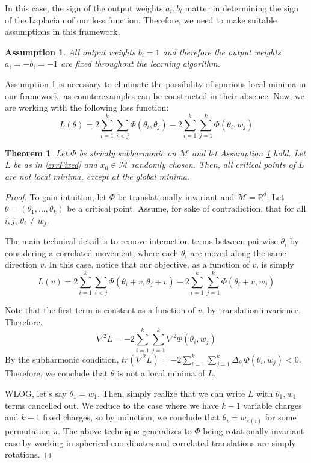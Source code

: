 \documentclass{article}
\newtheorem{theorem}{Theorem}[section]
\newtheorem{assumption}{Assumption}
\newcommand{\R}{{\mathbb{R}}}
\begin{document}
In this case, the sign of the output weights $a_i, b_i$ matter in determining the sign of the Laplacian of our loss function. Therefore, we need to make suitable assumptions in this framework.

\begin{assumption}
\label{outputFixed}
All output weights $b_i = 1$ and therefore the output weights  $a_i = - b_i = -1$ are fixed throughout the learning algorithm. 
\end{assumption}

Assumption \ref{outputFixed} is necessary to eliminate the possibility of spurious local minima in our framework, as counterexamples can be constructed in their absence. Now, we are working with the following loss function:
\begin{equation}\label{errFixed}
L(\theta) =  2\sum_{i=1}^k\sum_{i < j} \Phi(\theta_i,\theta_j) - 2\sum_{i=1}^k\sum_{j=1}^k\Phi(\theta_i,w_j)
\end{equation}
\begin{theorem}
Let $\Phi$ be strictly subharmonic on $\mathcal{M}$ and let Assumption \ref{outputFixed} hold. Let $L$ be as in \eqref{errFixed} and $x_0 \in \mathcal{M}$ randomly chosen. Then, all critical points of $L$ are not local minima, except at the global minima. 
\end{theorem}

\begin{proof}
To gain intuition, let $\Phi$ be translationally invariant and $\mathcal{M} = \R^d$. Let $\theta = (\theta_1,...,\theta_k)$ be a critical point. Assume, for sake of contradiction, that for all $i, j$, $\theta_i \neq w_j$. 

The main technical detail is to remove interaction terms between pairwise $\theta_i$ by considering a correlated movement, where each $\theta_i$ are moved along the same direction $v$. In this case, notice that our objective, as a function of $v$, is simply
\[L(v) =  2\sum_{i=1}^k\sum_{i < j} \Phi(\theta_i+v,\theta_j+v) - 2\sum_{i=1}^k\sum_{j=1}^k \Phi(\theta_i+v,w_j)\]

Note that the first term is constant as a function of $v$, by translation invariance. Therefore,
\[\nabla^2 L = -2\sum_{i=1}^k \sum_{j=1}^k \nabla^2\Phi(\theta_i, w_j)\]
By the subharmonic condition, $tr(\nabla^2L) = -2\sum_{i=1}^k\sum_{j=1}^k \Delta_{\theta_i}\Phi(\theta_i,w_j) < 0$. Therefore, we conclude that $\theta$ is not a local minima of $L$.

WLOG, let's say $\theta_1 = w_1$. Then, simply realize that we can write $L$ with $\theta_1,w_1$ terms cancelled out. We reduce to the case where we have $k-1$ variable charges and $k-1$ fixed charges, so by induction, we conclude that $\theta_i = w_{\pi(i)}$ for some permutation $\pi$. The above technique generalizes to $\Phi$ being rotationally invariant case by working in spherical coordinates and correlated translations are simply rotations. 
\end{proof}
\end{document}
